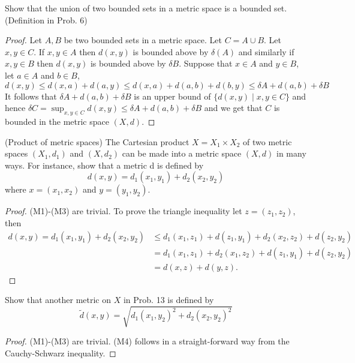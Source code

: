 \documentclass[12pt]{article}
\newcommand{\de}{\delta}
\newcommand{\un}{\cup}
\newenvironment{exercise}[2][Exercise]{\begin{trivlist}
\item[\hskip \labelsep {\bfseries #1}\hskip \labelsep {\bfseries #2.}]}{\end{trivlist}}
\begin{document}
\begin{exercise}{1.2.12}
    Show that the union of two bounded sets in a metric space is a bounded set. (Definition in Prob. 6)
\end{exercise}
\begin{proof}
    Let $A, B$ be two bounded sets in a metric space. Let $C = A \un B$. Let $x, y \in C$. If $x, y \in A$ then $d(x, y)$ is bounded above by $\de(A)$ and similarly if $x, y \in B$ then $d(x, y)$ is bounded above by $\de B$. Suppose that $x \in A$ and $y \in B$, let $a \in A$ and $b \in B$,
    \[ d(x, y) \leq d(x, a) + d(a, y) \leq d(x, a) + d(a, b) + d(b, y) \leq \de A + d(a, b) + \de B \]
    It follows that $\de A + d(a, b) + \de B$ is an upper bound of $\{ d(x, y) \mid x, y \in C \}$ and hence $\de C = \sup_{x, y \in C} d(x, y) \leq \de A + d(a, b) + \de B$ and we get that $C$ is bounded in the metric space $(X, d)$.
\end{proof}

\begin{exercise}{1.2.13}
    (Product of metric spaces) The Cartesian product $X = X_1 \times X_2$ of two metric spaces $(X_1, d_1)$ and $(X, d_2)$ can be made into a metric space $(X, d)$ in many ways. For instance, show that a metric d is defined by
    \[ d(x, y) = d_1 (x_1, y_1) + d_2 (x_2, y_2) \]
    where $x = (x_1, x_2)$ and $y = (y_1, y_2)$.
\end{exercise}
\begin{proof}
    (M1)-(M3) are trivial. To prove the triangle inequality let $z = (z_1, z_2)$, then
    \begin{align*}
        d(x, y) = d_1 (x_1, y_1) + d_2 (x_2, y_2) &\leq d_1 (x_1, z_1) + d(z_1, y_1) + d_2 (x_2, z_2) + d(z_2, y_2) \\
        &= d_1 (x_1, z_1) + d_2 (x_1, z_2) + d(z_1, y_1) + d(z_2, y_2) \\
        &= d(x, z) + d(y, z).
    \end{align*}
\end{proof}

\begin{exercise}{1.2.14}
    Show that another metric on $X$ in Prob. 13 is defined by
    \[ \tilde{d} (x, y) = \sqrt{d_1 (x_1, y_2)^2 + d_2 (x_2, y_2)^2} \]
\end{exercise}
\begin{proof}
    (M1)-(M3) are trivial. (M4) follows in a straight-forward way from the Cauchy-Schwarz inequality.
\end{proof}
\end{document}
